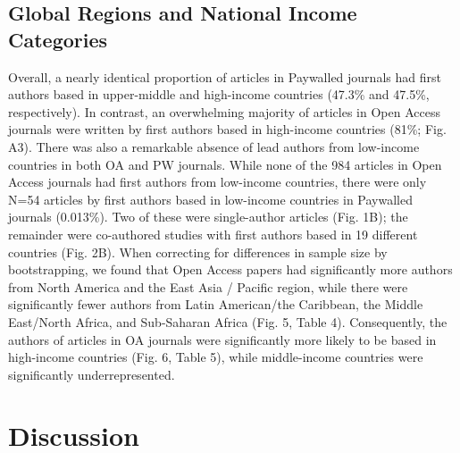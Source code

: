 \documentclass[english,man]{apa6}
\begin{document}
\hypertarget{global-regions-and-national-income-categories}{%
\subsection{Global Regions and National Income Categories}\label{global-regions-and-national-income-categories}}

Overall, a nearly identical proportion of articles in Paywalled journals had first authors based in upper-middle and high-income countries (47.3\% and 47.5\%, respectively). In contrast, an overwhelming majority of articles in Open Access journals were written by first authors based in high-income countries (81\%; Fig. A3). There was also a remarkable absence of lead authors from low-income countries in both OA and PW journals. While none of the 984 articles in Open Access journals had first authors from low-income countries, there were only N=54 articles by first authors based in low-income countries in Paywalled journals (0.013\%). Two of these were single-author articles (Fig. 1B); the remainder were co-authored studies with first authors based in 19 different countries (Fig. 2B). When correcting for differences in sample size by bootstrapping, we found that Open Access papers had significantly more authors from North America and the East Asia / Pacific region, while there were significantly fewer authors from Latin American/the Caribbean, the Middle East/North Africa, and Sub-Saharan Africa (Fig. 5, Table 4). Consequently, the authors of articles in OA journals were significantly more likely to be based in high-income countries (Fig. 6, Table 5), while middle-income countries were significantly underrepresented.

\hypertarget{discussion}{%
\section{Discussion}\label{discussion}}
\end{document}
